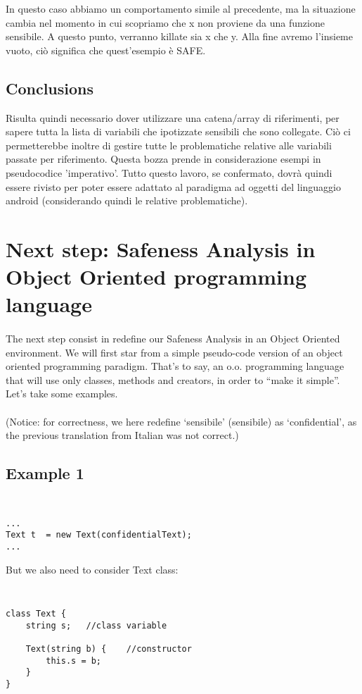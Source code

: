 \documentclass[letterpaper,twocolumn,10pt]{article}
\begin{document}
In questo caso abbiamo un comportamento simile al precedente, ma la situazione cambia nel momento in cui scopriamo che x non proviene da una funzione sensibile. A questo punto, verranno killate sia x che y. Alla fine avremo l'insieme vuoto, ci\`o significa che quest'esempio \`e SAFE.\\

\subsection{Conclusions}
Risulta quindi necessario dover utilizzare una catena/array di riferimenti, per sapere tutta la lista di variabili che ipotizzate sensibili che sono collegate. Ci\`o ci permetterebbe inoltre di gestire tutte le problematiche relative alle variabili passate per riferimento.
Questa bozza prende in considerazione esempi in pseudocodice 'imperativo'. Tutto questo lavoro, se confermato, dovr\`a quindi essere rivisto per poter essere adattato al paradigma ad oggetti del linguaggio android (considerando quindi le relative problematiche). \\


\section{Next step: Safeness Analysis in Object Oriented programming language}
\paragraph{}
The next step consist in redefine our Safeness Analysis in an Object Oriented environment. We will first star from a simple pseudo-code version of an object oriented programming paradigm. That's to say, an o.o. programming language that will use only classes, methods and creators, in order to ``make it simple''. Let's take some examples.\\ \\
(Notice: for correctness, we here redefine `sensibile' (sensibile) as `confidential', as the previous translation from Italian was not correct.)\\

\subsection{Example 1}
{\tt \small
\begin{verbatim}
...
Text t	= new Text(confidentialText);
...
\end{verbatim}
}
But we also need to consider Text class: \\
{\tt \small
\begin{verbatim}
class Text {
	string s;	//class variable
	
	Text(string b) { 	//constructor
		this.s = b;
	}
}
\end{verbatim}
}
\end{document}
